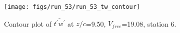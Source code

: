 \begin{figure}[H]
\centering
\texttt{[image: figs/run\_53/run\_53\_tw\_contour]}
\caption{Contour plot of $\overline{t^\prime w^\prime}$ at $z/c$=9.50, $V_{free}$=19.08, station 6.}
\label{fig:run_53_tw_contour}
\end{figure}


